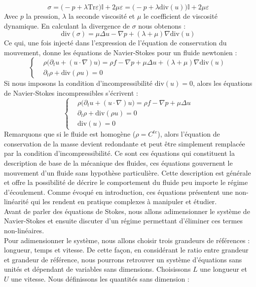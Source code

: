 $$\sigma = \big(- p + \lambda \text{Tr}\varepsilon\big)\mathbb{I} + 2\mu \varepsilon = \big(- p + \lambda \text{div}(u) \big)\mathbb{I} + 2\mu \varepsilon  $$
Avec $p$ la pression, $\lambda$ la seconde viscosité et $\mu$ le coefficient de viscosité dynamique.
En calculant la divergence de $\sigma$ nous obtenons :
$$ \text{div}(\sigma) = \mu \Delta u - \nabla p + (\lambda + \mu)\nabla \text{div}(u) $$
Ce qui, une fois injecté dans l'expression de l'équation de conservation du mouvement, donne les équations de Navier-Stokes pour un fluide newtonien :
$$\begin{cases}
    &\rho \big(\partial_t u + (u \cdot \nabla) u \big) = \rho f - \nabla p + \mu \Delta u + (\lambda + \mu)\nabla \text{div}(u) \\
    &\partial_t \rho + \text{div}(\rho u) = 0
\end{cases}$$
Si nous imposons la condition d'incompressibilité $\text{div}(u) = 0$, alors les équations de Navier-Stokes incompressibles s'écrivent :
$$ \begin{cases}
    &\rho \big(\partial_t u + (u \cdot \nabla) u \big) = \rho f - \nabla p + \mu \Delta u \\
    &\partial_t \rho + \text{div}(\rho u) = 0 \\
    &\text{div}(u) = 0
\end{cases} $$
Remarquons que si le fluide est homogène ($\rho = C^{te}$), alors l'équation de conservation de la masse devient redondante et peut être simplement remplacée par la condition d'incompressibilité.
Ce sont ces équations qui constituent la description de base de la mécanique des fluides, ces équations gouvernent le mouvement d'un fluide sans hypothèse particulière. Cette description est générale et offre 
la possibilité de décrire le comportement du fluide peu importe le régime d'écoulement. Comme évoqué en introduction, ces équations présentent une non-linéarité qui les rendent en pratique complexes à manipuler et étudier. \\
Avant de parler des équations de Stokes, nous allons adimensionner le système de Navier-Stokes et ensuite discuter d'un régime permettant d'éliminer ces termes non-linéaires. \\
Pour adimensionner le système, nous allons choisir trois grandeurs de références : longueur, temps et vitesse. De cette façon, en considérant le ratio entre grandeur et grandeur de référence, nous pourrons retrouver un système d'équations sans unités et dépendant de variables sans dimensions.
Choisissons $L$ une longueur et $U$ une vitesse. Nous définissons les quantités sans dimension :
